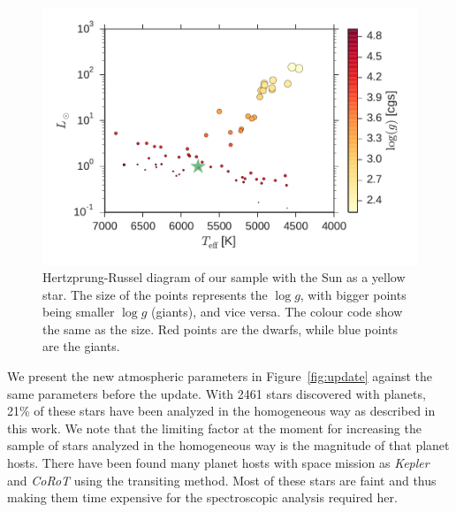 \documentclass{aa}
\begin{document}
\begin{figure}[tpb]
    \centering
    \includegraphics[width=1.0\linewidth,natwidth=440,natheight=290]{figures/HR.pdf}
    \caption{Hertzprung-Russel diagram of our sample with the Sun as a yellow
    star. The size of the points represents the $\log g$, with bigger points
    being smaller $\log g$ (giants), and vice versa. The colour code show the
    same as the size. Red points are the dwarfs, while blue points are the
    giants.}
    \label{fig:HRD}
\end{figure}

We present the new atmospheric parameters in Figure~\ref{fig:update} against the
same parameters before the update. With 2461 stars discovered with planets, 21\%
of these stars have been analyzed in the homogeneous way as described in this
work. We note that the limiting factor at the moment for increasing the sample
of stars analyzed in the homogeneous way is the magnitude of that planet hosts.
There have been found many planet hosts with space mission as \emph{Kepler} and
\emph{CoRoT} using the transiting method. Most of these stars are faint and thus
making them time expensive for the spectroscopic analysis required her.
\end{document}
